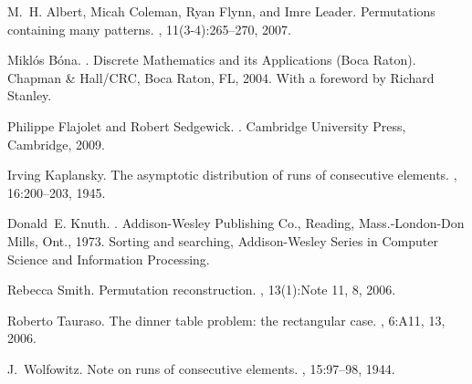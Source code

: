 \documentclass[11pt]{article}
\theoremstyle{plain}
\theoremstyle{definition}
\begin{document}
\begin{thebibliography}{9}
M.~H. Albert, Micah Coleman, Ryan Flynn, and Imre Leader.
\newblock Permutations containing many patterns.
, 11(3-4):265--270, 2007.

Mikl{\'o}s B{\'o}na.
.
\newblock Discrete Mathematics and its Applications (Boca Raton). Chapman \&
  Hall/CRC, Boca Raton, FL, 2004.
\newblock With a foreword by Richard Stanley.

Philippe Flajolet and Robert Sedgewick.
.
\newblock Cambridge University Press, Cambridge, 2009.

Irving Kaplansky.
\newblock The asymptotic distribution of runs of consecutive elements.
, 16:200--203, 1945.

Donald~E. Knuth.
.
\newblock Addison-Wesley Publishing Co., Reading, Mass.-London-Don Mills, Ont.,
  1973.
\newblock Sorting and searching, Addison-Wesley Series in Computer Science and
  Information Processing.

Rebecca Smith.
\newblock Permutation reconstruction.
, 13(1):Note 11, 8, 2006.

Roberto Tauraso.
\newblock The dinner table problem: the rectangular case.
, 6:A11, 13, 2006.

J.~Wolfowitz.
\newblock Note on runs of consecutive elements.
, 15:97--98, 1944.

\end{thebibliography}
\end{document}
